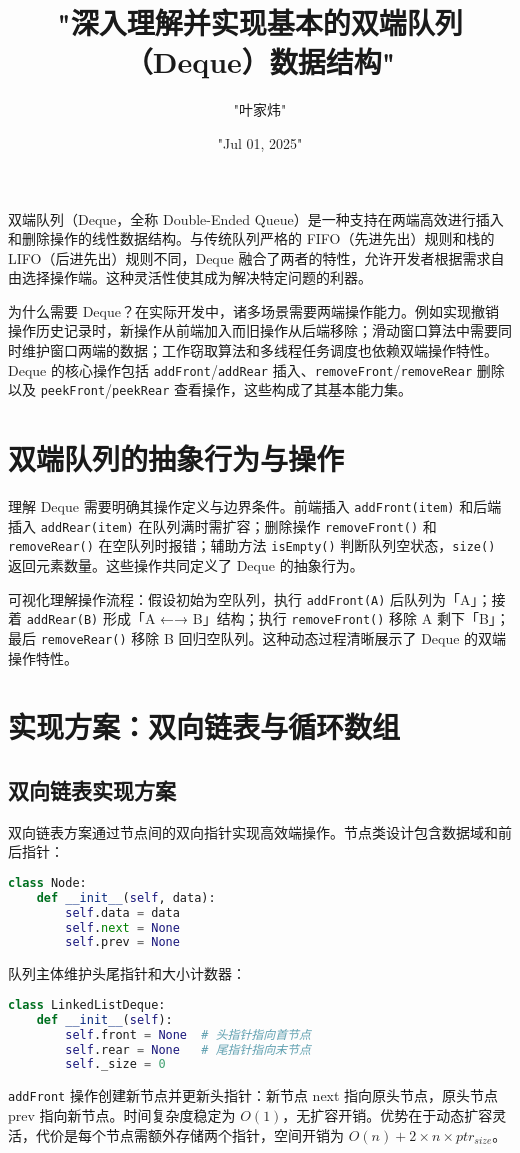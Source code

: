 \title{"深入理解并实现基本的双端队列（Deque）数据结构"}
\author{"叶家炜"}
\date{"Jul 01, 2025"}
\maketitle
双端队列（Deque，全称 Double-Ended Queue）是一种支持在两端高效进行插入和删除操作的线性数据结构。与传统队列严格的 FIFO（先进先出）规则和栈的 LIFO（后进先出）规则不同，Deque 融合了两者的特性，允许开发者根据需求自由选择操作端。这种灵活性使其成为解决特定问题的利器。\par
为什么需要 Deque？在实际开发中，诸多场景需要两端操作能力。例如实现撤销操作历史记录时，新操作从前端加入而旧操作从后端移除；滑动窗口算法中需要同时维护窗口两端的数据；工作窃取算法和多线程任务调度也依赖双端操作特性。Deque 的核心操作包括 \texttt{addFront}/\texttt{addRear} 插入、\texttt{removeFront}/\texttt{removeRear} 删除以及 \texttt{peekFront}/\texttt{peekRear} 查看操作，这些构成了其基本能力集。\par
\chapter{双端队列的抽象行为与操作}
理解 Deque 需要明确其操作定义与边界条件。前端插入 \texttt{addFront(item)} 和后端插入 \texttt{addRear(item)} 在队列满时需扩容；删除操作 \texttt{removeFront()} 和 \texttt{removeRear()} 在空队列时报错；辅助方法 \texttt{isEmpty()} 判断队列空状态，\texttt{size()} 返回元素数量。这些操作共同定义了 Deque 的抽象行为。\par
可视化理解操作流程：假设初始为空队列，执行 \texttt{addFront(A)} 后队列为「A」；接着 \texttt{addRear(B)} 形成「A ←→ B」结构；执行 \texttt{removeFront()} 移除 A 剩下「B」；最后 \texttt{removeRear()} 移除 B 回归空队列。这种动态过程清晰展示了 Deque 的双端操作特性。\par
\chapter{实现方案：双向链表与循环数组}
\section{双向链表实现方案}
双向链表方案通过节点间的双向指针实现高效端操作。节点类设计包含数据域和前后指针：\par
\begin{lstlisting}[language=python]
class Node:
    def __init__(self, data):
        self.data = data
        self.next = None
        self.prev = None
\end{lstlisting}
队列主体维护头尾指针和大小计数器：\par
\begin{lstlisting}[language=python]
class LinkedListDeque:
    def __init__(self):
        self.front = None  # 头指针指向首节点
        self.rear = None   # 尾指针指向末节点
        self._size = 0
\end{lstlisting}
\texttt{addFront} 操作创建新节点并更新头指针：新节点 next 指向原头节点，原头节点 prev 指向新节点。时间复杂度稳定为 $O(1)$，无扩容开销。优势在于动态扩容灵活，代价是每个节点需额外存储两个指针，空间开销为 $O(n) + 2 \times n \times ptr_{size}$。\par
